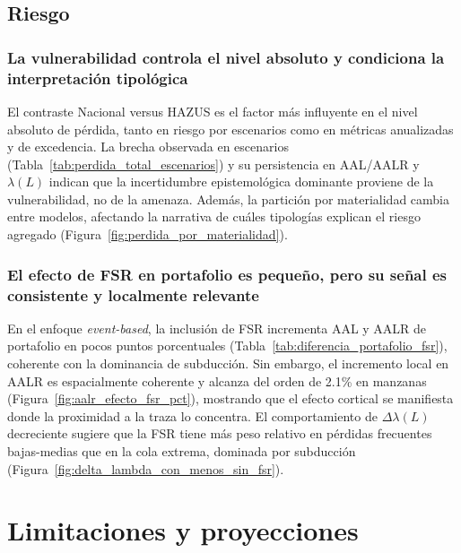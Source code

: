 \subsection{Riesgo}
\label{subsec:conc_riesgo}

\subsubsection{La vulnerabilidad controla el nivel absoluto y condiciona la interpretación tipológica}
\label{subsubsec:conc_riesgo_vuln}

El contraste Nacional versus HAZUS es el factor más influyente en el nivel absoluto de pérdida, tanto en riesgo por escenarios como en métricas anualizadas y de excedencia. La brecha observada en escenarios (Tabla~\ref{tab:perdida_total_escenarios}) y su persistencia en AAL/AALR y $\lambda(L)$ indican que la incertidumbre epistemológica dominante proviene de la vulnerabilidad, no de la amenaza. Además, la partición por materialidad cambia entre modelos, afectando la narrativa de cuáles tipologías explican el riesgo agregado (Figura~\ref{fig:perdida_por_materialidad}).

\subsubsection{El efecto de FSR en portafolio es pequeño, pero su señal es consistente y localmente relevante}
\label{subsubsec:conc_riesgo_fsr}

En el enfoque \textit{event-based}, la inclusión de FSR incrementa AAL y AALR de portafolio en pocos puntos porcentuales (Tabla~\ref{tab:diferencia_portafolio_fsr}), coherente con la dominancia de subducción. Sin embargo, el incremento local en AALR es espacialmente coherente y alcanza del orden de 2.1\% en manzanas (Figura~\ref{fig:aalr_efecto_fsr_pct}), mostrando que el efecto cortical se manifiesta donde la proximidad a la traza lo concentra. El comportamiento de $\Delta\lambda(L)$ decreciente sugiere que la FSR tiene más peso relativo en pérdidas frecuentes bajas-medias que en la cola extrema, dominada por subducción (Figura~\ref{fig:delta_lambda_con_menos_sin_fsr}).


\section{Limitaciones y proyecciones}
\label{sec:limitaciones_proyecciones}


